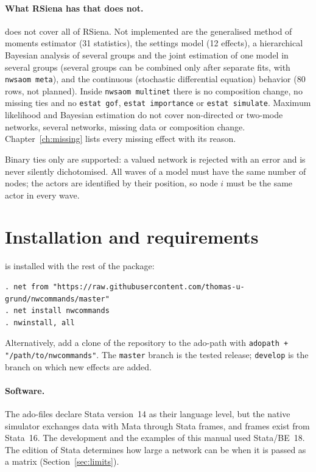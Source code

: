 \paragraph{What RSiena has that \nwsaom{} does not.} \nwsaom{} does not cover all of RSiena. Not implemented are the generalised method of moments estimator (31 statistics), the settings model (12 effects), a hierarchical Bayesian analysis of several groups and the joint estimation of one model in several groups (several groups can be combined only after separate fits, with \texttt{nwsaom meta}), and the continuous (stochastic differential equation) behavior (80 rows, not planned). Inside \texttt{nwsaom multinet} there is no composition change, no missing ties and no \texttt{estat gof}, \texttt{estat importance} or \texttt{estat simulate}. Maximum likelihood and Bayesian estimation do not cover non-directed or two-mode networks, several networks, missing data or composition change. Chapter~\ref{ch:missing} lists every missing effect with its reason.

Binary ties only are supported: a valued network is rejected with an error and is never silently dichotomised. All waves of a model must have the same number of nodes; the actors are identified by their position, so node $i$ must be the same actor in every wave.

\section{Installation and requirements}

\nwsaom{} is installed with the rest of the package:
\begin{lstlisting}
. net from "https://raw.githubusercontent.com/thomas-u-grund/nwcommands/master"
. net install nwcommands
. nwinstall, all
\end{lstlisting}
Alternatively, add a clone of the repository to the ado-path with \texttt{adopath + "/path/to/nwcommands"}. The \texttt{master} branch is the tested release; \texttt{develop} is the branch on which new effects are added.

\paragraph{Software.} The ado-files declare Stata version~14 as their language level, but the native simulator exchanges data with Mata through Stata frames, and frames exist from Stata~16. The development and the examples of this manual used Stata/BE~18. The edition of Stata determines how large a network can be when it is passed as a matrix (Section~\ref{sec:limits}).

